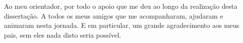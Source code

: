 \acknowledgements

Ao meu orientador, por todo o apoio que me deu ao longo da realização desta dissertação. A todos os meus amigos que me acompanharam, ajudaram e animaram nesta jornada. E em particular, um grande agradecimento aos meus pais, sem eles nada disto seria possível.